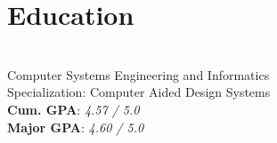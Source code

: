 \documentclass[]{deedy-resume}
\begin{document}
\begin{minipage}[t]{0.25\textwidth}
\sectionspace


\section{Education}

 \\
Computer Systems Engineering and Informatics \\
Specialization: Computer Aided Design Systems \\
\textbf{Cum. GPA}: \textit{4.57 / 5.0} \\
\textbf{Major GPA}: \textit{4.60 / 5.0}

\sectionspace


\end{minipage}
\hfill
\columnspace
%
%
\end{document}
